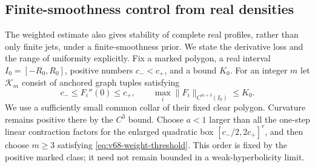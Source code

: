 \subsection{Finite-smoothness control from real densities}

The weighted estimate also gives stability of complete real profiles,
rather than only finite jets, under a finite-smoothness prior.  We state
the derivative loss and the range of uniformity explicitly.
Fix a marked polygon, a real interval $I_0=[-R_0,R_0]$, positive
numbers $c_-<c_+$, and a bound $K_0$.  For an integer $m$ let
$\mathcal K_m$ consist of anchored graph tuples satisfying
\begin{equation}\label{eq:v68-smooth-class}
 c_-\le F_i''(0)\le c_+,\qquad
 \max_i\|F_i\|_{C^{m+3}(I_0)}\le K_0.
\end{equation}
We use a sufficiently small common collar of their fixed clear
polygon.  Curvature remains positive there by the $C^3$ bound.
Choose $a<1$ larger than all the one-step linear contraction factors
for the enlarged quadratic box $[c_-/2,2c_+]^r$, and then choose
$m\ge3$ satisfying \eqref{eq:v68-weight-threshold}.  This order is
fixed by the positive marked class; it need not remain bounded in a
weak-hyperbolicity limit.

